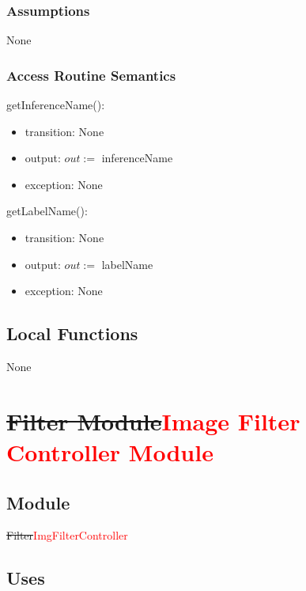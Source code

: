 \documentclass[12pt, titlepage]{article}
\begin{document}
\subsubsection* {Assumptions}

None

\subsubsection* {Access Routine Semantics}

\noindent getInferenceName():
\begin{itemize}
\item transition: None\\
\item output: $out := $ inferenceName\\
\item exception: None\\

\end{itemize}

\noindent getLabelName():
\begin{itemize}
\item transition: None\\
\item output: $out := $ labelName\\
\item exception: None\\

\end{itemize}

\subsection*{Local Functions}

None

\medskip
\medskip


\newpage

\section* {\sout{Filter Module}\textcolor{red}{Image Filter Controller Module}}

\subsection*{Module}

\sout{Filter}\textcolor{red}{ImgFilterController}

\subsection* {Uses}
\end{document}
